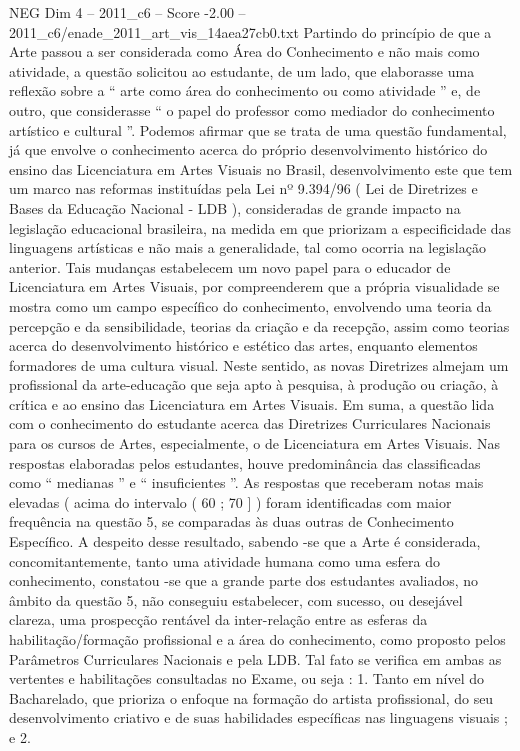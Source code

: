 \begin{textsample}{NEG Dim 4 – 2011\_c6 – Score -2.00 – 2011\_c6/enade\_2011\_art\_vis\_14aea27cb0.txt}
Partindo do princípio de que a Arte passou a ser considerada como Área do Conhecimento e não mais como atividade, a questão solicitou ao estudante, de um lado, que elaborasse uma reflexão sobre a “ arte como área do conhecimento ou como atividade ” e, de outro, que considerasse “ o papel do professor como mediador do conhecimento artístico e cultural ”.
Podemos afirmar que se trata de uma questão fundamental, já que envolve o conhecimento acerca do próprio desenvolvimento histórico do ensino das Licenciatura em Artes Visuais no Brasil, desenvolvimento este que tem um marco nas reformas instituídas pela Lei nº 9.394/96 ( Lei de Diretrizes e Bases da Educação Nacional - LDB ), consideradas de grande impacto na legislação educacional brasileira, na medida em que priorizam a especificidade das linguagens artísticas e não mais a generalidade, tal como ocorria na legislação anterior.
Tais mudanças estabelecem um novo papel para o educador de Licenciatura em Artes Visuais, por compreenderem que a própria visualidade se mostra como um campo específico do conhecimento, envolvendo uma teoria da percepção e da sensibilidade, teorias da criação e da recepção, assim como teorias acerca do desenvolvimento histórico e estético das artes, enquanto elementos formadores de uma cultura visual.
Neste sentido, as novas Diretrizes almejam um profissional da arte-educação que seja apto à pesquisa, à produção ou criação, à crítica e ao ensino das Licenciatura em Artes Visuais.
Em suma, a questão lida com o conhecimento do estudante acerca das Diretrizes Curriculares Nacionais para os cursos de Artes, especialmente, o de Licenciatura em Artes Visuais.
Nas respostas elaboradas pelos estudantes, houve predominância das classificadas como “ medianas ” e “ insuficientes ”.
As respostas que receberam notas mais elevadas ( acima do intervalo ( 60 ; 70 ] ) foram identificadas com maior frequência na questão 5, se comparadas às duas outras de Conhecimento Específico.
A despeito desse resultado, sabendo -se que a Arte é considerada, concomitantemente, tanto uma atividade humana como uma esfera do conhecimento, constatou -se que a grande parte dos estudantes avaliados, no âmbito da questão 5, não conseguiu estabelecer, com sucesso, ou desejável clareza, uma prospecção rentável da inter-relação entre as esferas da habilitação/formação profissional e a área do conhecimento, como proposto pelos Parâmetros Curriculares Nacionais e pela LDB.
Tal fato se verifica em ambas as vertentes e habilitações consultadas no Exame, ou seja : 1.
Tanto em nível do Bacharelado, que prioriza o enfoque na formação do artista profissional, do seu desenvolvimento criativo e de suas habilidades específicas nas linguagens visuais ; e 2.

\end{textsample}

